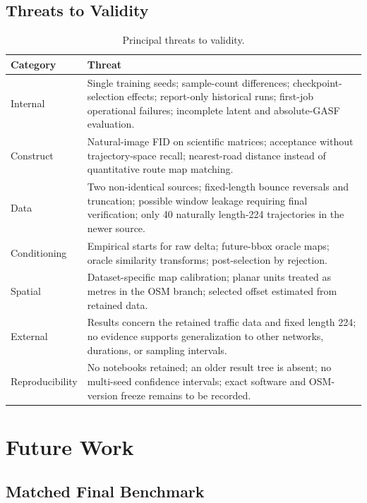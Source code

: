 \documentclass[12pt,a4paper,oneside]{report}
\begin{document}
\section{Threats to Validity}

\begin{table}[p]
\centering
\caption{Principal threats to validity.}
\label{tab:threats}
\small
\begin{tabular}{L{0.18\textwidth}L{0.75\textwidth}}
\toprule
Category & Threat \\
\midrule
Internal & Single training seeds; sample-count differences; checkpoint-selection effects; report-only historical runs; first-job operational failures; incomplete latent and absolute-GASF evaluation. \\
Construct & Natural-image FID on scientific matrices; acceptance without trajectory-space recall; nearest-road distance instead of quantitative route map matching. \\
Data & Two non-identical sources; fixed-length bounce reversals and truncation; possible window leakage requiring final verification; only 40 naturally length-224 trajectories in the newer source. \\
Conditioning & Empirical starts for raw delta; future-bbox oracle maps; oracle similarity transforms; post-selection by rejection. \\
Spatial & Dataset-specific map calibration; planar units treated as metres in the OSM branch; selected offset estimated from retained data. \\
External & Results concern the retained traffic data and fixed length 224; no evidence supports generalization to other networks, durations, or sampling intervals. \\
Reproducibility & No notebooks retained; an older result tree is absent; no multi-seed confidence intervals; exact software and OSM-version freeze remains to be recorded. \\
\bottomrule
\end{tabular}
\end{table}

\chapter{Future Work}
\label{chap:future}

\section{Matched Final Benchmark}
\end{document}
